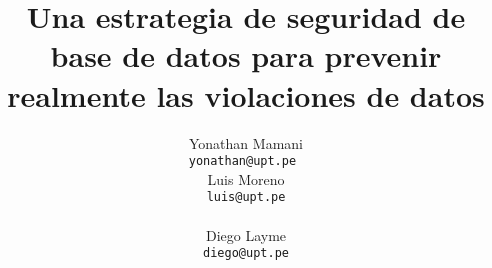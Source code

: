 \documentclass[11pt]{article}
\title{Una estrategia de seguridad de base de datos para prevenir realmente las violaciones de datos}
\author{Yonathan Mamani \\
  {\tt yonathan@upt.pe } \\\And
  {Luis Moreno \\
  {\tt luis@upt.pe} \\} \\\And
  Diego Layme\\
  {\tt diego@upt.pe} \\}
\begin{document}
\maketitle


\date{}








\end{document}
